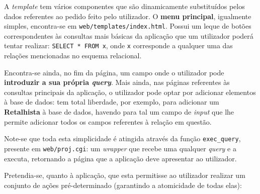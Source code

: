 \documentclass[12pt,a4paper]{article}
\begin{document}
  A \textit{template} tem vários componentes que são dinamicamente substituídos
  pelos dados referentes ao pedido feito pelo utilizador. O \textbf{menu principal},
  igualmente simples, encontra-se em \texttt{web/templates/index.html}. Possui um
  leque de botões correspondentes às consultas mais básicas da aplicação que um
  utilizador poderá tentar realizar: \texttt{SELECT * FROM x}, onde \texttt{x} corresponde a qualquer
  uma das relações mencionadas no esquema relacional.
  
  Encontra-se ainda, no fim da página, um campo onde o utilizador pode \textbf{introduzir a sua própria \textit{query}}.
  Mais ainda, nas páginas referentes às consultas principais da aplicação,
  o utilizador pode optar por adicionar elementos à base de dados: tem total
  liberdade, por exemplo, para adicionar um \textbf{Retalhista} à base de dados,
  havendo para tal um campo de \textit{input} que lhe permite adicionar todos os
  campos referentes à relação em questão.

  Note-se que toda esta simplicidade é atingida através da função \texttt{exec\_query},
  presente em \texttt{web/proj.cgi}: um \textit{wrapper} que recebe uma qualquer
  \textit{query} e a executa, retornando a página que a aplicação deve apresentar
  ao utilizador.

  \vspace*{0.5cm}

  Pretendia-se, quanto à aplicação, que esta permitisse ao utilizador realizar um conjunto
  de ações pré-determinado (garantindo a atomicidade de todas elas):
\end{document}
